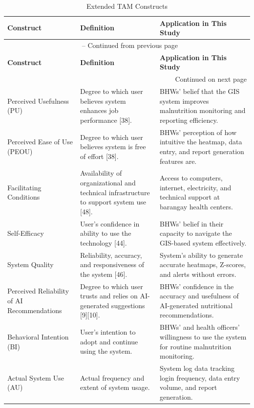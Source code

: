 \documentclass[12pt, a4paper]{report}
\begin{document}
\vspace{0.3cm}
\begin{longtable}{p{3.5cm} p{5.5cm} p{5cm}}
    \caption{Extended TAM Constructs} \label{tab:tam_constructs} \\
    \toprule
    \textbf{Construct} & \textbf{Definition} & \textbf{Application in This Study} \\
    \midrule
    \endfirsthead
    \multicolumn{3}{c}{{\tablename\ \thetable{} -- Continued from previous page}} \\
    \toprule
    \textbf{Construct} & \textbf{Definition} & \textbf{Application in This Study} \\
    \midrule
    \endhead
    \midrule
    \multicolumn{3}{r}{{Continued on next page}} \\
    \endfoot
    \bottomrule
    \endlastfoot
    Perceived Usefulness (PU) & Degree to which user believes system enhances job performance [38]. & BHWs' belief that the GIS system improves malnutrition monitoring and reporting efficiency. \\
    \addlinespace
    Perceived Ease of Use (PEOU) & Degree to which user believes system is free of effort [38]. & BHWs' perception of how intuitive the heatmap, data entry, and report generation features are. \\
    \addlinespace
    Facilitating Conditions & Availability of organizational and technical infrastructure to support system use [48]. & Access to computers, internet, electricity, and technical support at barangay health centers. \\
    \addlinespace
    Self-Efficacy & User's confidence in ability to use the technology [44]. & BHWs' belief in their capacity to navigate the GIS-based system effectively. \\
    \addlinespace
    System Quality & Reliability, accuracy, and responsiveness of the system [46]. & System's ability to generate accurate heatmaps, Z-scores, and alerts without errors. \\
    \addlinespace
    Perceived Reliability of AI Recommendations & Degree to which user trusts and relies on AI-generated suggestions [9][10]. & BHWs' confidence in the accuracy and usefulness of AI-generated nutritional recommendations. \\
    \addlinespace
    Behavioral Intention (BI) & User's intention to adopt and continue using the system. & BHWs' and health officers' willingness to use the system for routine malnutrition monitoring. \\
    \addlinespace
    Actual System Use (AU) & Actual frequency and extent of system usage. & System log data tracking login frequency, data entry volume, and report generation. \\
\end{longtable}
\vspace{0.3cm}
\end{document}
